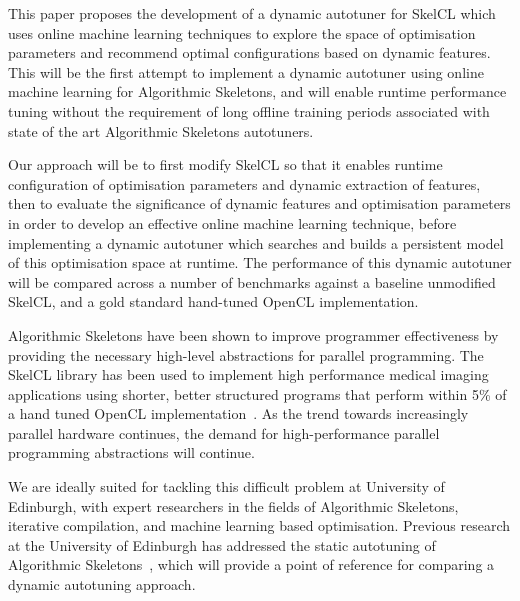 This paper proposes the development of a dynamic autotuner for SkelCL
which uses online machine learning techniques to explore the space of
optimisation parameters and recommend optimal configurations based on
dynamic features. This will be the first attempt to implement a
dynamic autotuner using online machine learning for Algorithmic
Skeletons, and will enable runtime performance tuning without the
requirement of long offline training periods associated with state of
the art Algorithmic Skeletons autotuners.

Our approach will be to first modify SkelCL so that it enables runtime
configuration of optimisation parameters and dynamic extraction of
features, then to evaluate the significance of dynamic features and
optimisation parameters in order to develop an effective online
machine learning technique, before implementing a dynamic autotuner
which searches and builds a persistent model of this optimisation
space at runtime. The performance of this dynamic autotuner will be
compared across a number of benchmarks against a baseline unmodified
SkelCL, and a gold standard hand-tuned OpenCL implementation.

Algorithmic Skeletons have been shown to improve programmer
effectiveness by providing the necessary high-level abstractions for
parallel programming. The SkelCL library has been used to implement
high performance medical imaging applications using shorter, better
structured programs that perform within 5\% of a hand tuned OpenCL
implementation~\cite{Steuwer2012}. As the trend towards increasingly
parallel hardware continues, the demand for high-performance parallel
programming abstractions will continue.

We are ideally suited for tackling this difficult problem at
University of Edinburgh, with expert researchers in the fields of
Algorithmic Skeletons, iterative compilation, and machine learning
based optimisation. Previous research at the University of Edinburgh
has addressed the static autotuning of Algorithmic
Skeletons~\cite{Collins2012, Collins2013}, which will provide a point
of reference for comparing a dynamic autotuning approach.
